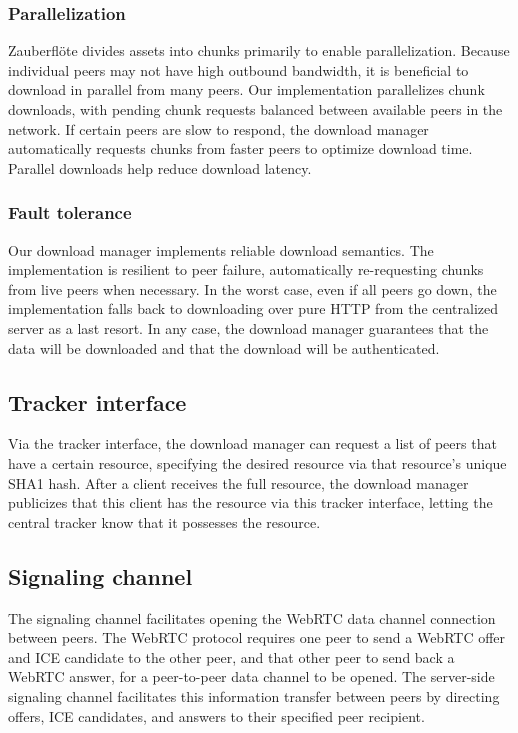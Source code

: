 \documentclass[letterpaper,twocolumn,10pt]{article}
\newcommand{\zbf}{Zauberfl\"{o}te\xspace}
\begin{document}
\subsubsection{Parallelization}

\zbf divides assets into chunks primarily to enable parallelization. Because
individual peers may not have high outbound bandwidth, it is beneficial to
download in parallel from many peers. Our implementation parallelizes chunk
downloads, with pending chunk requests balanced between available peers in the
network. If certain peers are slow to respond, the download manager
automatically requests chunks from faster peers to optimize download time.
Parallel downloads help reduce download latency.

\subsubsection{Fault tolerance}

Our download manager implements reliable download semantics. The implementation
is resilient to peer failure, automatically re-requesting chunks from live
peers when necessary. In the worst case, even if all peers go down, the
implementation falls back to downloading over pure HTTP from the centralized
server as a last resort. In any case, the download manager guarantees that the
data will be downloaded and that the download will be authenticated.

\subsection{Tracker interface}

Via the tracker interface, the download manager can request a list of peers that
have a certain resource, specifying the desired resource via that resource's
unique SHA1 hash. After a client receives the full resource, the download
manager publicizes that this client has the resource via this tracker interface,
letting the central tracker know that it possesses the resource.

\subsection{Signaling channel}

The signaling channel facilitates opening the WebRTC data channel connection between
peers. The WebRTC protocol requires one peer to send a WebRTC offer and ICE candidate
to the other peer, and that other peer to send back a WebRTC answer, for a peer-to-peer
data channel to be opened. The server-side signaling channel facilitates this
information transfer between peers by  directing offers, ICE candidates, and answers
to their specified peer recipient.
\end{document}

